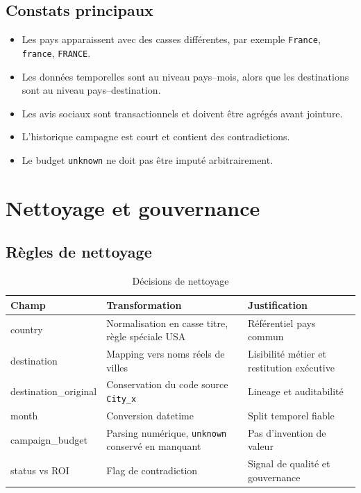 \documentclass[11pt,a4paper]{report}
\begin{document}
\section{Constats principaux}

\begin{itemize}[leftmargin=*]
    \item Les pays apparaissent avec des casses différentes, par exemple \texttt{France}, \texttt{france}, \texttt{FRANCE}.
    \item Les données temporelles sont au niveau pays--mois, alors que les destinations sont au niveau pays--destination.
    \item Les avis sociaux sont transactionnels et doivent être agrégés avant jointure.
    \item L'historique campagne est court et contient des contradictions.
    \item Le budget \texttt{unknown} ne doit pas être imputé arbitrairement.
\end{itemize}

\chapter{Nettoyage et gouvernance}

\section{Règles de nettoyage}

\begin{table}[H]
\centering
\caption{Décisions de nettoyage}
\begin{tabularx}{\textwidth}{lXX}
\toprule
\textbf{Champ} & \textbf{Transformation} & \textbf{Justification} \\
\midrule
country & Normalisation en casse titre, règle spéciale USA & Référentiel pays commun \\
destination & Mapping vers noms réels de villes & Lisibilité métier et restitution exécutive \\
destination\_original & Conservation du code source \texttt{City\_x} & Lineage et auditabilité \\
month & Conversion datetime & Split temporel fiable \\
campaign\_budget & Parsing numérique, \texttt{unknown} conservé en manquant & Pas d'invention de valeur \\
status vs ROI & Flag de contradiction & Signal de qualité et gouvernance \\
\bottomrule
\end{tabularx}
\end{table}
\end{document}
